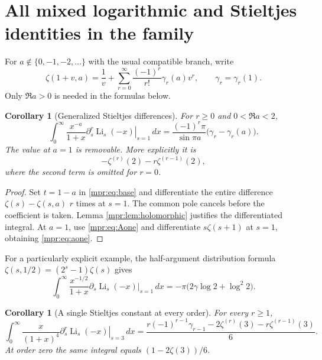 \documentclass[11pt,letterpaper]{article}
\numberwithin{equation}{section}
\newtheorem{corollary}[theorem]{Corollary}
\theoremstyle{definition}
\theoremstyle{remark}
\begin{document}
\section{All mixed logarithmic and Stieltjes identities in the family}
\label{mpr:sec:jets}

For $a\notin\{0,-1,-2,\ldots\}$ with the usual compatible branch,
write
\[
 \zeta(1+v,a)=\frac1v+
       \sum_{r=0}^\infty\frac{(-1)^r}{r!}\gamma_r(a)v^r,
 \qquad \gamma_r=\gamma_r(1).
\]
Only $\Re a>0$ is needed in the formulas below.

\begin{corollary}[Generalized Stieltjes differences]
\label{mpr:cor:stieltjes}
For $r\ge0$ and $0<\Re a<2$,
\begin{equation}\label{mpr:eq:generalizedstieltjes}
 \int_0^\infty\frac{x^{-a}}{1+x}
   \left.\partial_s^r\operatorname{Li}_s(-x)\right|_{s=1}\,dx
  =\frac{(-1)^r\pi}{\sin\pi a}
                     \bigl(\gamma_r-\gamma_r(a)\bigr).
\end{equation}
The value at $a=1$ is removable.  More explicitly it is
\begin{equation}\label{mpr:eq:aone}
 -\zeta^{(r)}(2)-r\zeta^{(r-1)}(2),
\end{equation}
where the second term is omitted for $r=0$.
\end{corollary}

\begin{proof}
Set $t=1-a$ in \eqref{mpr:eq:base} and differentiate the entire
difference $\zeta(s)-\zeta(s,a)$ $r$ times at $s=1$.
The common pole cancels before the coefficient is taken.  Lemma
\ref{mpr:lem:holomorphic} justifies the differentiated integral.
At $a=1$, use \eqref{mpr:eq:Aone} and differentiate $s\zeta(s+1)$ at
$s=1$, obtaining \eqref{mpr:eq:aone}.
\end{proof}

For a particularly explicit example, the half-argument distribution
formula $\zeta(s,1/2)=(2^s-1)\zeta(s)$ gives
\begin{equation}\label{mpr:eq:halfexample}
 \int_0^\infty\frac{x^{-1/2}}{1+x}
   \left.\partial_s\operatorname{Li}_s(-x)\right|_{s=1}\,dx
 =-\pi\bigl(2\gamma\log2+\log^2 2\bigr).
\end{equation}

\begin{corollary}[A single Stieltjes constant at every order]
\label{mpr:cor:quarticstieltjes}
For every $r\ge1$,
\begin{equation}\label{mpr:eq:quarticstieltjes}
 \boxed{\displaystyle
 \int_0^\infty\frac{x}{(1+x)^4}
    \left.\partial_s^r\operatorname{Li}_s(-x)\right|_{s=3}\,dx
 =\frac{r(-1)^{r-1}\gamma_{r-1}
       -2\zeta^{(r)}(3)-r\zeta^{(r-1)}(3)}6.}
\end{equation}
At order zero the same integral equals $(1-2\zeta(3))/6$.
\end{corollary}
\end{document}
